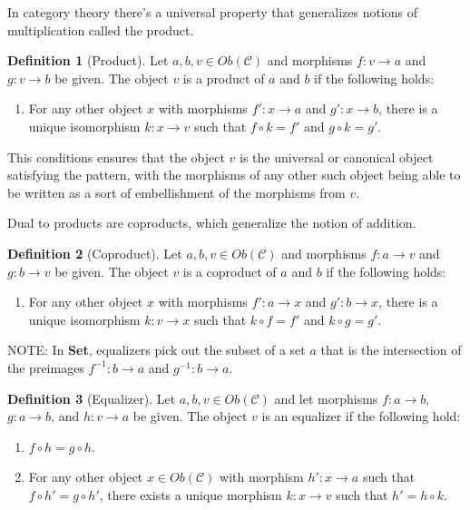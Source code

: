 \documentclass{article}
\theoremstyle{definition}
\newtheorem{definition}{Definition}
\begin{document}
In category theory there's a universal property that generalizes notions of multiplication called the product.
\begin{definition}[Product]
    Let $a,b,v\in Ob(\mathcal{C})$ and morphisms $f:v\rightarrow a$ and $g:v\rightarrow b$ be given.
    The object $v$ is a product of $a$ and $b$ if the following holds:
    \begin{enumerate}
        \item For any other object $x$ with morphisms $f':x\rightarrow a$ and $g':x\rightarrow b$, there is a unique isomorphism $k:x\rightarrow v$ such that $f\circ k=f'$ and $g\circ k=g'$.
    \end{enumerate}
\end{definition}
This conditions ensures that the object $v$ is the universal or canonical object satisfying the pattern, with the morphisms of any other such object being able to be written as a sort of embellishment of the morphisms from $v$.

Dual to products are coproducts, which generalize the notion of addition.
\begin{definition}[Coproduct]
    Let $a,b,v\in Ob(\mathcal{C})$ and morphisms $f:a\rightarrow v$ and $g:b\rightarrow v$ be given.
    The object $v$ is a coproduct of $a$ and $b$ if the following holds:
    \begin{enumerate}
        \item For any other object $x$ with morphisms $f':a\rightarrow x$ and $g':b\rightarrow x$, there is a unique isomorphism $k:v\rightarrow x$ such that $k\circ f=f'$ and $k\circ g=g'$.
    \end{enumerate}
\end{definition}

NOTE: In \textbf{Set}, equalizers pick out the subset of a set $a$ that is the intersection of the preimages $f^{-1}:b\rightarrow a$ and $g^{-1}:b\rightarrow a$.
\begin{definition}[Equalizer]
    Let $a,b,v\in Ob(\mathcal{C})$ and let morphisms $f:a\rightarrow b$, $g:a\rightarrow b$, and $h:v\rightarrow a$ be given.
    The object $v$ is an equalizer if the following hold:
    \begin{enumerate}
        \item $f\circ h=g\circ h$.
        \item For any other object $x\in Ob(\mathcal{C})$ with morphism $h':x\rightarrow a$ such that $f\circ h'=g\circ h'$, there exists a unique morphism $k:x\rightarrow v$ such that $h'=h\circ k$.
    \end{enumerate}
\end{definition}
\end{document}
